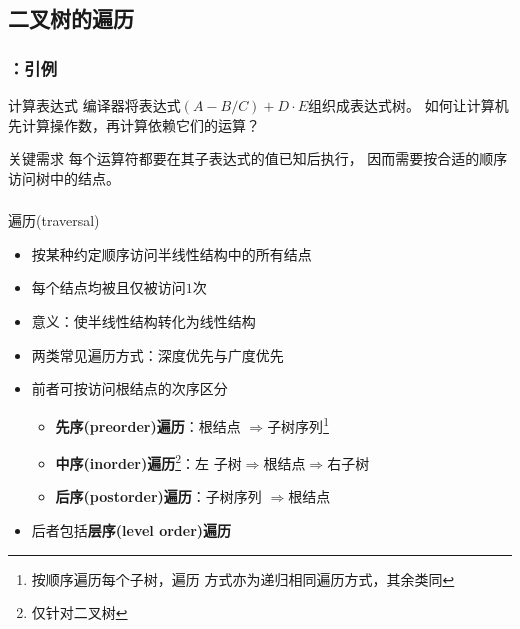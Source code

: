 \subsection{二叉树的遍历}

\begin{frame}
    \frametitle{\insertsubsectionhead：引例}
    \begin{exampleblock}{计算表达式}
        编译器将表达式$(A-B/C)+D\cdot E$组织成表达式树。
        如何让计算机先计算操作数，再计算依赖它们的运算？
    \end{exampleblock}
    \begin{block}{关键需求}
        每个运算符都要在其子表达式的值已知后执行，
        因而需要按合适的顺序访问树中的结点。
    \end{block}
\end{frame}

\begin{frame}
    \frametitle{\insertsubsectionhead}
    \begin{block}{遍历(traversal)}
        \begin{itemize}
            \item 按某种约定顺序访问半线性结构中的所有结点
            \item 每个结点均\alert{被且仅被}访问$1$次
            \item \alert{意义}：使半线性结构转化为线性结构
            \item 两类常见遍历方式：\alert{深度}优先与\alert{广度}优先
            \item 前者可按访问\alert{根}结点的次序区分
                \begin{itemize}
                    \item \textbf{先序(preorder)遍历}：\alert{根}结点
                        $\Rightarrow$子树序列\footnote{按顺序遍历每个子树，遍历
                        方式亦为递归相同遍历方式，其余类同}
                    \item \textbf{中序(inorder)遍历}\footnote{仅针对二叉树}：左
                        子树$\Rightarrow$\alert{根}结点$\Rightarrow$右子树
                    \item \textbf{后序(postorder)遍历}：子树序列
                        $\Rightarrow$\alert{根}结点
                \end{itemize}
            \item 后者包括\textbf{层序(level order)遍历}
        \end{itemize}
    \end{block}
\end{frame}

